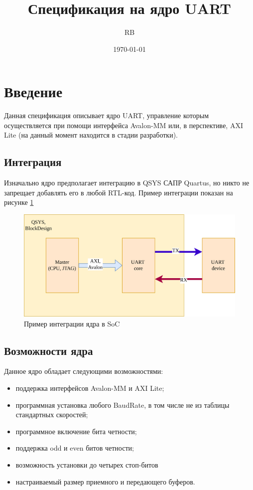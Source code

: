 \documentclass[a4paper,12pt]{article}
\title{\Huge\textbf{Спецификация на ядро UART}}
\author{\huge RB}
\date{\today}
\begin{document}
\maketitle
\newpage


%
%
\listoffigures
{}
\newpage

%
\listoftables
{}
\newpage


%
%
%
%
\section{Введение}
\label{sec:introduction}

Данная спецификация описывает ядро UART, управление которым осуществляется при помощи интерфейса Avalon-MM или, в перспективе, AXI Lite (на данный момент находится в стадии разработки).

    \subsection{Интеграция}
    Изначально ядро предполагает интеграцию в QSYS САПР Quartus, но никто не запрещает добавлять его в любой RTL-код. Пример интеграции показан на рисунке \ref{img:integrated_ip}

    \begin{figure}[H]
        \centering
        \includegraphics[width=15cm]{Integrate.png}
        \caption{Пример интеграции ядра в SoC}
        \label{img:integrated_ip}
    \end{figure}

    \subsection{Возможности ядра}
    Данное ядро обладает следующими возможностями:
    \begin{itemize}
     \item поддержка интерфейсов Avalon-MM и AXI Lite;
     \item программная установка любого BaudRate, в том числе не из таблицы стандартных скоростей;
     \item программное включение бита четности;
     \item поддержка odd и even битов четности;
     \item возможность установки до четырех стоп-битов
     \item настраиваемый размер приемного и передающего буферов.
    \end{itemize}
\end{document}
